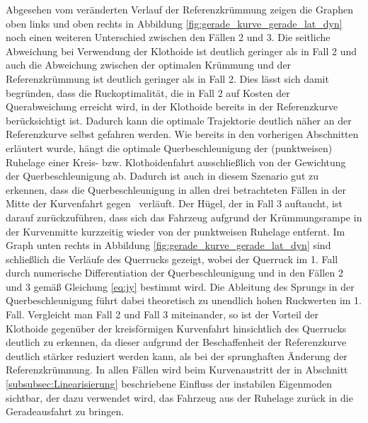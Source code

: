 Abgesehen vom veränderten Verlauf der Referenzkrümmung zeigen die Graphen oben links und oben rechts in Abbildung \ref{fig:gerade_kurve_gerade_lat_dyn} noch einen weiteren Unterschied zwischen den Fällen 2 und 3. Die seitliche Abweichung bei Verwendung der Klothoide ist deutlich geringer als in Fall 2 und auch die Abweichung zwischen der optimalen Krümmung und der Referenzkrümmung ist deutlich geringer als in Fall 2. Dies lässt sich damit begründen, dass die Ruckoptimalität, die in Fall 2 auf Kosten der Querabweichung erreicht wird, in der Klothoide bereits in der Referenzkurve berücksichtigt ist. Dadurch kann die optimale Trajektorie deutlich näher an der Referenzkurve selbst gefahren werden. Wie bereits in den vorherigen Abschnitten erläutert wurde, hängt die optimale Querbeschleunigung der (punktweisen) Ruhelage einer Kreis- bzw. Klothoidenfahrt ausschließlich von der Gewichtung der Querbeschleunigung ab. Dadurch ist auch in diesem Szenario gut zu erkennen, dass die Querbeschleunigung in allen drei betrachteten Fällen in der Mitte der Kurvenfahrt gegen \ayRL~verläuft. Der \glqq Hügel\grqq, der in Fall 3 auftaucht, ist darauf zurückzuführen, dass sich das Fahrzeug aufgrund der Krümmungsrampe in der Kurvenmitte kurzzeitig wieder von der punktweisen Ruhelage entfernt. Im Graph unten rechts in Abbildung \ref{fig:gerade_kurve_gerade_lat_dyn} sind schließlich die Verläufe des Querrucks gezeigt, wobei der Querruck im 1. Fall durch numerische Differentiation der Querbeschleunigung und in den Fällen 2 und 3 gemäß Gleichung \eqref{eq:jy} bestimmt wird. Die Ableitung des Sprungs in der Querbeschleunigung führt dabei theoretisch zu unendlich hohen Ruckwerten im 1. Fall. Vergleicht man Fall 2 und Fall 3 miteinander, so ist der Vorteil der Klothoide gegenüber der kreisförmigen Kurvenfahrt hinsichtlich des Querrucks deutlich zu erkennen, da dieser aufgrund der Beschaffenheit der Referenzkurve deutlich stärker reduziert werden kann, als bei der sprunghaften Änderung der Referenzkrümmung. In allen Fällen wird beim Kurvenaustritt der in Abschnitt \ref{subsubsec:Linearisierung} beschriebene Einfluss der instabilen Eigenmoden sichtbar, der dazu verwendet wird, das Fahrzeug aus der Ruhelage zurück in die Geradeausfahrt zu bringen.

